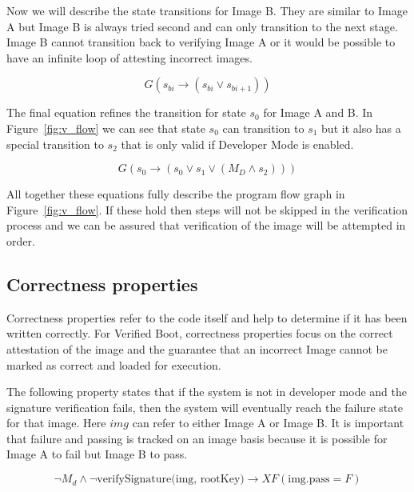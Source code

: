 Now we will describe the state transitions for Image B. 
They are similar to Image A but Image B is always tried second and can only transition to the next stage. 
Image B cannot transition back to verifying Image A or it would be possible to have an infinite loop of attesting incorrect images.

\begin{equation}
    G(s_{bi} \to (s_{bi} \lor s_{bi+1}))
\end{equation}

The final equation refines the transition for state $s_0$ for Image A and B.
In Figure~\ref{fig:v_flow} we can see that state $s_0$ can transition to $s_1$ but it also has a special transition to $s_2$ that is only valid if Developer Mode is enabled.

\begin{equation}
    G(s_0 \to (s_0 \lor s_{1} \lor (M_D \land s_{2})))
\end{equation}

All together these equations fully describe the program flow graph in Figure~\ref{fig:v_flow}. 
If these hold then steps will not be skipped in the verification process and we can be assured that verification of the image will be attempted in order.

\subsection{Correctness properties}

Correctness properties refer to the code itself and help to determine if it has been written correctly.
For Verified Boot, correctness properties focus on the correct attestation of the image and the guarantee that an incorrect Image cannot be marked as correct and loaded for execution.

The following property states that if the system is not in developer mode and the signature verification fails, then the system will eventually reach the failure state for that image.
Here $img$ can refer to either Image A or Image B.
It is important that failure and passing is tracked on an image basis because it is possible for Image A to fail but Image B to pass.

\begin{equation} \label{eq:sig_cor}
 \lnot M_d \land \lnot \text{verifySignature(img, rootKey)} \to XF (\text{img.pass} = F)
\end{equation}

